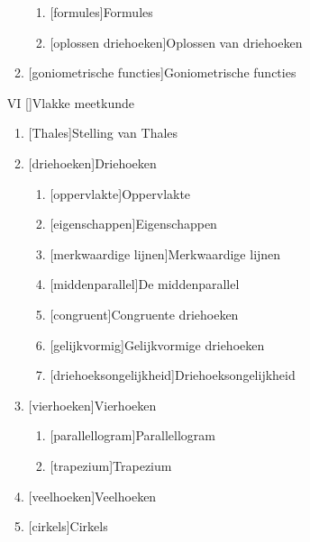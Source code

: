 \documentclass{article}
\begin{document}
\begin{itemize}
\begin{enumerate}
\begin{enumerate}
\item {}[formules]{Formules}
\item {}[oplossen driehoeken]{Oplossen van driehoeken}
\end{enumerate}%
\item {}[goniometrische functies]{Goniometrische functies}
\end{enumerate}%
\item[VI] []{Vlakke meetkunde}
\begin{enumerate}%
\item {}[Thales]{Stelling van Thales}
\item {}[driehoeken]{Driehoeken}
\begin{enumerate}%
\item {}[oppervlakte]{Oppervlakte}
\item {}[eigenschappen]{Eigenschappen}
\item {}[merkwaardige lijnen]{Merkwaardige lijnen}
\item {}[middenparallel]{De middenparallel}
\item {}[congruent]{Congruente driehoeken}
\item {}[gelijkvormig]{Gelijkvormige driehoeken}
\item {}[driehoeksongelijkheid]{Driehoeksongelijkheid}
\end{enumerate}%
\item {}[vierhoeken]{Vierhoeken}
\begin{enumerate}%
\item {}[parallellogram]{Parallellogram}
\item {}[trapezium]{Trapezium}
\end{enumerate}%
\item {}[veelhoeken]{Veelhoeken}
\item {}[cirkels]{Cirkels}

\end{enumerate}
\end{itemize}
\end{document}
